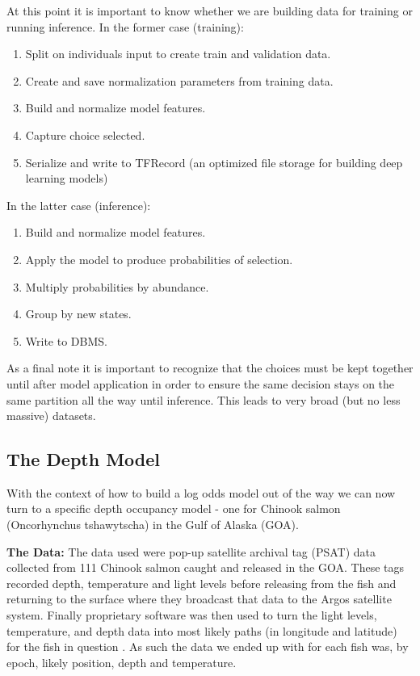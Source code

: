 \documentclass[11pt]{article}
\begin{document}
At this point it is important to know whether we are building data for training or running inference. In the former case (training):

\begin{enumerate}
\item Split on individuals input to create train and validation data.
\item Create and save normalization parameters from training data.
\item Build and normalize model features.
\item Capture choice selected.
\item Serialize and write to TFRecord (an optimized file storage for building deep learning models)
\end{enumerate}

In the latter case (inference):

\begin{enumerate}
\item Build and normalize model features.
\item Apply the model to produce probabilities of selection.
\item Multiply probabilities by abundance.
\item Group by new states.
\item Write to DBMS.
\end{enumerate}

As a final note it is important to recognize that the choices must be kept together until after model application in order to ensure the same decision stays on the same partition all the way until inference. This leads to very broad (but no less massive) datasets. 

\subsection{The Depth Model}

With the context of how to build a log odds model out of the way we can now turn to a specific depth occupancy model - one for Chinook salmon (Oncorhynchus tshawytscha) in the Gulf of Alaska (GOA). \newline

\textbf{The Data:} The data used were pop-up satellite archival tag (PSAT) data collected from 111 Chinook salmon caught and released in the GOA. These tags recorded depth, temperature and light levels before releasing from the fish and returning to the surface where they broadcast that data to the Argos satellite system. Finally proprietary software was then used to turn the light levels, temperature, and depth data into most likely paths (in longitude and latitude) for the fish in question \cite{PSAT}. As such the data we ended up with for each fish was, by epoch, likely position, depth and temperature. \newline
\end{document}
